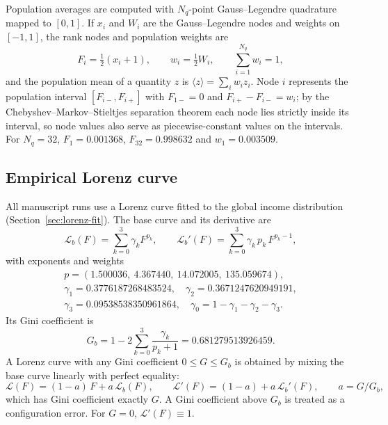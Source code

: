\documentclass[11pt]{article}
\newcommand{\Lor}{\mathcal{L}}
\newcommand{\Nq}{N_{q}}
\begin{document}
Population averages are computed with $\Nq$-point Gauss--Legendre quadrature
mapped to $[0,1]$. If $x_i$ and $W_i$ are the Gauss--Legendre nodes and
weights on $[-1,1]$, the rank nodes and population weights are
\begin{equation}
  F_i = \tfrac{1}{2}(x_i + 1), \qquad w_i = \tfrac{1}{2} W_i,
  \qquad \sum_{i=1}^{\Nq} w_i = 1,
\end{equation}
and the population mean of a quantity $z$ is $\langle z\rangle =
\sum_i w_i z_i$. Node $i$ represents the population interval
$[F_{i-}, F_{i+}]$ with $F_{1-}=0$ and $F_{i+} - F_{i-} = w_i$; by the
Chebyshev--Markov--Stieltjes separation theorem each node lies strictly inside
its interval, so node values also serve as piecewise-constant values on the
intervals. For $\Nq = 32$, $F_1 = 0.001368$, $F_{32} = 0.998632$ and
$w_1 = 0.003509$.

\subsection{Empirical Lorenz curve}
\label{sec:lorenz}

All manuscript runs use a Lorenz curve fitted to the global income
distribution (Section~\ref{sec:lorenz-fit}). The base curve and its derivative
are
\begin{equation}
  \Lor_b(F) = \sum_{k=0}^{3} \gamma_k F^{p_k}, \qquad
  \Lor_b'(F) = \sum_{k=0}^{3} \gamma_k\, p_k\, F^{p_k - 1},
  \label{eq:lorenz-base}
\end{equation}
with exponents and weights
\begin{gather*}
  p = (1.500036,\ 4.367440,\ 14.072005,\ 135.059674),\\
  \gamma_1 = 0.3776187268483524,\quad \gamma_2 = 0.3671247620949191,\\
  \gamma_3 = 0.09538538350961864,\quad \gamma_0 = 1-\gamma_1-\gamma_2-\gamma_3 .
\end{gather*}
Its Gini coefficient is
\begin{equation}
  G_b = 1 - 2\sum_{k=0}^{3}\frac{\gamma_k}{p_k+1} = 0.681279513926459.
\end{equation}
A Lorenz curve with any Gini coefficient $0\le G\le G_b$ is obtained by mixing
the base curve linearly with perfect equality:
\begin{equation}
  \Lor(F) = (1-a)\,F + a\,\Lor_b(F), \qquad
  \Lor'(F) = (1-a) + a\,\Lor_b'(F), \qquad a = G/G_b,
  \label{eq:lorenz-mix}
\end{equation}
which has Gini coefficient exactly $G$. A Gini coefficient above $G_b$ is
treated as a configuration error. For $G = 0$, $\Lor'(F) \equiv 1$.
\end{document}
